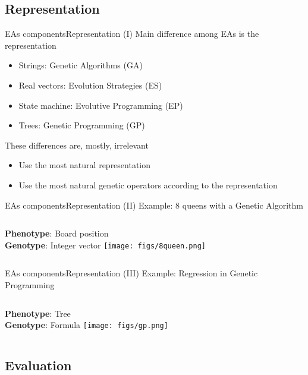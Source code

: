 \documentclass[10pt,compress]{beamer} %
\begin{document}
\subsection{Representation}
\begin{frame}{EAs components}{Representation (I)} 
	Main difference among EAs is the representation
	\begin{itemize}
		\item Strings: \alert{Genetic Algorithms (GA)}
		\item Real vectors: \alert{Evolution Strategies (ES)}
		\item State machine: \alert{Evolutive Programming (EP)}
		\item Trees: \alert{Genetic Programming (GP)}
	\end{itemize}
	These differences are, mostly, irrelevant
	\begin{itemize}
		\item Use the most natural representation
		\item Use the most natural genetic operators according to the representation
	\end{itemize}
\end{frame}

\begin{frame}{EAs components}{Representation (II)} 
	Example: 8 queens with a Genetic Algorithm
	\bigskip
    \begin{columns}
	   \textbf{Phenotype}: Board position\\
	   \textbf{Genotype}: Integer vector
		\texttt{[image: figs/8queen.png]}
	\end{columns}
\end{frame}

\begin{frame}{EAs components}{Representation (III)} 
	Example: Regression in Genetic Programming
	\bigskip
    \begin{columns}
	   \textbf{Phenotype}: Tree\\
	   \textbf{Genotype}: Formula
		\texttt{[image: figs/gp.png]}
	\end{columns}
\end{frame}

\subsection{Evaluation}
\end{document}
